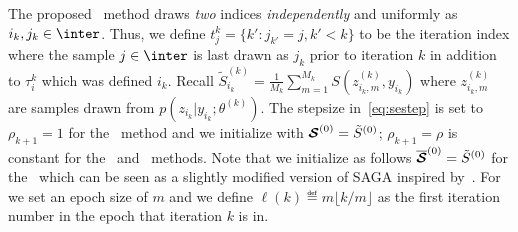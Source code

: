 \documentclass[11pt]{article}
\theoremstyle{t}
\newcommand{\boxalign}[2][0.97\textwidth]{
  \par\noindent\tikzstyle{mybox} = [draw=black,inner sep=6pt]
  \begin{center}\begin{tikzpicture}
   \node [mybox] (box){%
    \begin{minipage}{#1}{\vspace{-5mm}#2}\end{minipage}
   };
  \end{tikzpicture}\end{center}
}
\begin{document}
The proposed \FISAEM\ method draws \emph{two} indices \emph{independently} and uniformly as $i_k, j_k \in \inter$. 
Thus, we define $t_j^k = \{ k' : j_{k'} = j , k' < k \}$ to be the iteration index where the sample $j \in \inter$ is last drawn as $j_k$ prior to iteration $k$ in addition to $\tau_i^k$ which was defined \wrt $i_k$.
Recall $\tilde{S}_{i_k}^{(k)}=  \frac{1}{M_k} \sum_{m=1}^{M_k} S(z_{i_k,m}^{(k)}, y_{i_k})$ where $z_{i_k,m}^{(k)}$ are samples drawn from $ p(z_{i_k}|y_{i_k};\theta^{(k)})$.
The stepsize in~\eqref{eq:sestep} is set to $\rho_{k+1} = 1$ for the \ISAEM\ method and we initialize with $\StocEstep^{(0)} = \tilde{S}^{(0)}$; $\rho_{k+1} = \rho$ is  constant for the \SAEMVR\ and \FISAEM\ methods. Note that we initialize as follows $\overline{\StocEstep}^{(0)} = \tilde{S}^{(0)}$ for the \FISAEM\ which can be seen as a slightly modified version of SAGA inspired by~\citep{reddi2016fast}.
For \SAEMVR\, we set an epoch size of $m$ and we define $\ell(k) \eqdef m \lfloor k/m \rfloor$ as the first iteration number in the epoch that iteration $k$ is in.
\end{document}
